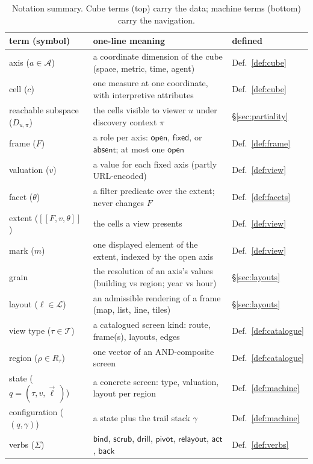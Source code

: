 \documentclass[11pt,a4paper]{article}
\theoremstyle{remark}
\newcommand{\Ax}{\mathcal{A}}                    %
\newcommand{\open}{\mathsf{open}}
\newcommand{\fixed}{\mathsf{fixed}}
\newcommand{\absent}{\mathsf{absent}}
\newcommand{\vbind}{\mathsf{bind}}
\newcommand{\vscrub}{\mathsf{scrub}}
\newcommand{\vdrill}{\mathsf{drill}}
\newcommand{\vpivot}{\mathsf{pivot}}
\newcommand{\vrelayout}{\mathsf{relayout}}
\newcommand{\vact}{\mathsf{act}}
\newcommand{\vback}{\mathsf{back}}
\newcommand{\TT}{\mathcal{T}}                    %
\newcommand{\LL}{\mathcal{L}}
\newcommand{\Sig}{\Sigma}
\begin{document}
\begin{table}[t]
\centering
\small
\begin{tabular}{@{}l@{\quad}p{8.0cm}@{\quad}l@{}}
term (symbol) & one-line meaning & defined \\
\hline
axis ($a \in \Ax$) & a coordinate dimension of the cube (space, metric, time, agent) & Def.~\ref{def:cube} \\
cell ($c$) & one measure at one coordinate, with interpretive attributes & Def.~\ref{def:cube} \\
reachable subspace ($D_{u,\pi}$) & the cells visible to viewer $u$ under discovery context $\pi$ & \S\ref{sec:partiality} \\
frame ($F$) & a role per axis: $\open$, $\fixed$, or $\absent$; at most one $\open$ & Def.~\ref{def:frame} \\
valuation ($v$) & a value for each fixed axis (partly URL-encoded) & Def.~\ref{def:view} \\
facet ($\theta$) & a filter predicate over the extent; never changes $F$ & Def.~\ref{def:facets} \\
extent ($[\![ F, v, \theta ]\!]$) & the cells a view presents & Def.~\ref{def:view} \\
mark ($m$) & one displayed element of the extent, indexed by the open axis & Def.~\ref{def:view} \\
grain & the resolution of an axis's values (building vs region; year vs hour) & \S\ref{sec:layouts} \\
layout ($\ell \in \LL$) & an admissible rendering of a frame (map, list, line, tiles) & \S\ref{sec:layouts} \\
view type ($\tau \in \TT$) & a catalogued screen kind: route, frame(s), layouts, edges & Def.~\ref{def:catalogue} \\
region ($\rho \in R_\tau$) & one vector of an AND-composite screen & Def.~\ref{def:catalogue} \\
state ($q = (\tau, v, \vec{\ell}\,)$) & a concrete screen: type, valuation, layout per region & Def.~\ref{def:machine} \\
configuration ($(q, \gamma)$) & a state plus the trail stack $\gamma$ & Def.~\ref{def:machine} \\
verbs ($\Sig$) & $\vbind$, $\vscrub$, $\vdrill$, $\vpivot$, $\vrelayout$, $\vact$, $\vback$ & Def.~\ref{def:verbs} \\
\end{tabular}
\caption{Notation summary. Cube terms (top) carry the data; machine terms
(bottom) carry the navigation.}
\label{tab:notation}
\end{table}
\end{document}
